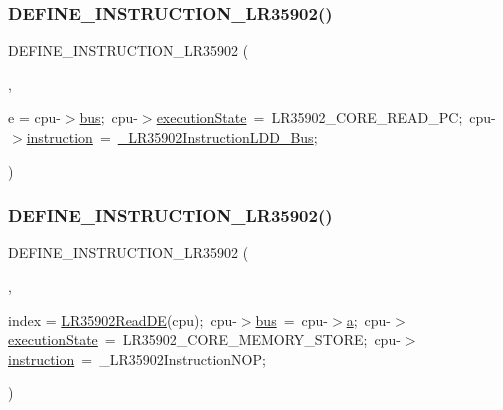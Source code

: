 \subsubsection{\texorpdfstring{D\+E\+F\+I\+N\+E\+\_\+\+I\+N\+S\+T\+R\+U\+C\+T\+I\+O\+N\+\_\+\+L\+R35902()}{DEFINE\_INSTRUCTION\_LR35902()}\hspace{0.1cm}{\footnotesize\ttfamily [12/20]}}
{\footnotesize\ttfamily D\+E\+F\+I\+N\+E\+\_\+\+I\+N\+S\+T\+R\+U\+C\+T\+I\+O\+N\+\_\+\+L\+R35902 (\begin{DoxyParamCaption}\item[{L\+D\+D\+E\+Delay}]{,  }\item[{cpu-\/$>$}]{e = {\ttfamily cpu-\/$>$\mbox{\hyperlink{isa-lr35902_8c_a6163e7e073b87ad067db0a3b10da6be9}{bus}};~cpu-\/$>$\mbox{\hyperlink{isa-lr35902_8c_a087a53d4d283226a73c530dd2883d634}{execution\+State}}~=~LR35902\+\_\+CORE\+\_\+READ\+\_\+PC;~cpu-\/$>$\mbox{\hyperlink{isa-lr35902_8c_a516462a0e821c76277faaeb2a1364b35}{instruction}}~=~\mbox{\hyperlink{isa-lr35902_8c_a46e949289fe83e3e5973781585b9b186}{\+\_\+\+L\+R35902\+Instruction\+L\+D\+D\+\_\+\+Bus}};} }\end{DoxyParamCaption})}

\mbox{\label{isa-lr35902_8c_a5236210414a230506eeb793516c322ea}} 
\subsubsection{\texorpdfstring{D\+E\+F\+I\+N\+E\+\_\+\+I\+N\+S\+T\+R\+U\+C\+T\+I\+O\+N\+\_\+\+L\+R35902()}{DEFINE\_INSTRUCTION\_LR35902()}\hspace{0.1cm}{\footnotesize\ttfamily [13/20]}}
{\footnotesize\ttfamily D\+E\+F\+I\+N\+E\+\_\+\+I\+N\+S\+T\+R\+U\+C\+T\+I\+O\+N\+\_\+\+L\+R35902 (\begin{DoxyParamCaption}\item[{L\+D\+D\+E\+\_\+A}]{,  }\item[{cpu-\/$>$}]{index = {\ttfamily \mbox{\hyperlink{isa-lr35902_8c_a59a8dd63f3535192f0f9512a3ad09596}{L\+R35902\+Read\+DE}}(cpu);~cpu-\/$>$\mbox{\hyperlink{isa-lr35902_8c_a6163e7e073b87ad067db0a3b10da6be9}{bus}}~=~cpu-\/$>$\mbox{\hyperlink{isa-lr35902_8c_a7015284d2957ab7cdf82d2535a2fa547}{a}};~cpu-\/$>$\mbox{\hyperlink{isa-lr35902_8c_a087a53d4d283226a73c530dd2883d634}{execution\+State}}~=~LR35902\+\_\+CORE\+\_\+MEMORY\+\_\+STORE;~cpu-\/$>$\mbox{\hyperlink{isa-lr35902_8c_a516462a0e821c76277faaeb2a1364b35}{instruction}}~=~\+\_\+LR35902InstructionNOP;} }\end{DoxyParamCaption})}

